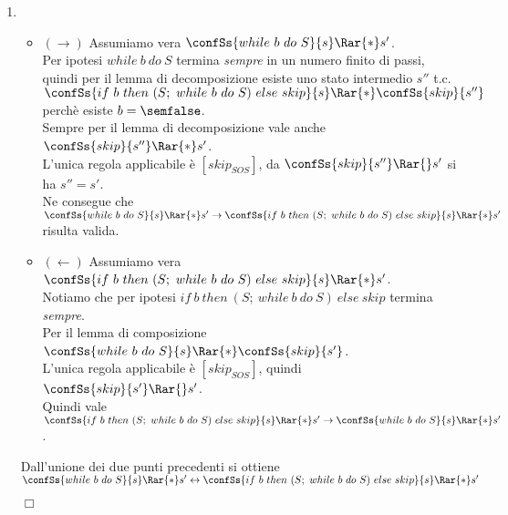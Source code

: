 {\begin{enumerate}[label=\alph*)]
    \item {} \\
    \begin{itemize}
      \item $(\rightarrow)$ Assumiamo vera $\confSs{while \ b \ do \ S}{s} 
         \Rar{*} s'$. \\
         Per ipotesi $while \ b \ do \ S$ termina \textit{sempre} in un
         numero finito di passi, \\ quindi per il lemma di decomposizione esiste 
         uno stato intermedio $s''$ t.c. \\
         $\confSs{if  \ b \ then \ (S; \ while \ b \ do \ S) \ else \ skip}{s} 
         \Rar{*} \confSs{skip}{s''}$ perchè esiste $b = \semfalse$. \\
         Sempre per il lemma di decomposizione vale anche 
         $\confSs{skip}{s''} \Rar{*} s'$.\\
         L'unica regola applicabile è $[skip_{SOS}]$, da 
         $\confSs{skip}{s''} \Rar{} s'$ si ha $s''=s'$. \\
         Ne consegue che 
         $\confSs{while \ b \ do \ S}{s} \Rar{*} s' \rightarrow 
         \confSs{if  \ b \ then \ (S; \ while \ b \ do \ S) \ else \ skip}{s} 
         \Rar{*} s'$ risulta valida.
      \item $(\leftarrow)$ Assumiamo vera $\confSs{if  \ b \ then \ (S; 
            \ while \ b \ do \              S) \ else \ skip}{s} \Rar{*} s'$. \\
            Notiamo che per ipotesi $if  \ b \ then \ (S; \ while \ b \ do \ S) 
            \ else \ skip$ termina \textit{sempre}. \\
            Per il lemma di composizione $\confSs{while \ b \ do \ S}{s} \Rar{*} 
            \confSs{skip}{s'}$. \\
            L'unica regola applicabile è $[skip_{SOS}]$, quindi 
            $\confSs{skip}{s'} \Rar{} s'$. \\
            Quindi vale 
            $\confSs{if  \ b \ then \ (S; \ while \ b \ do \ S) \ else \ skip}{s} 
            \Rar{*} s' \rightarrow \confSs{while \ b \ do \ S}{s} \Rar{*} s'$.
      \end{itemize}
         Dall'unione dei due punti precedenti si ottiene \\ 
         $\confSs{while \ b \ do \ S}{s} \Rar{*} s' \leftrightarrow 
         \confSs{if  \ b \ then \ (S; \ while \ b \ do \ S) \ else \ skip}{s} 
         \Rar{*} s'$
         \begin{flushright}
         $\Box$
         \end{flushright}


\end{enumerate}}
